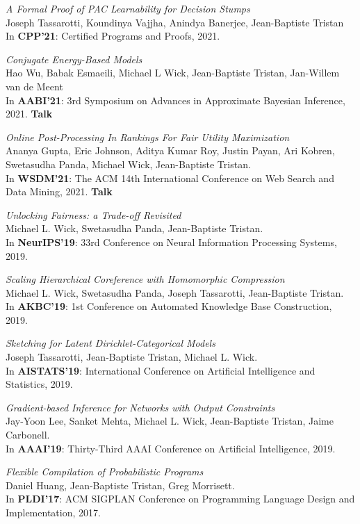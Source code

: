 \documentclass[margin,line]{res}
\begin{document}
\begin{resume}
\emph{A Formal Proof of PAC Learnability for Decision Stumps}\\
Joseph Tassarotti, Koundinya Vajjha, Anindya Banerjee, Jean-Baptiste Tristan\\
In {\bf CPP'21}: Certified Programs and Proofs, 2021.

\emph{Conjugate Energy-Based Models}\\
Hao Wu, Babak Esmaeili, Michael L Wick, Jean-Baptiste Tristan, Jan-Willem van de Meent\\
In {\bf AABI'21}: 3rd Symposium on
Advances in Approximate Bayesian Inference, 2021. {\bf Talk}

\emph{Online Post-Processing In Rankings For Fair Utility Maximization}\\
Ananya Gupta, Eric Johnson, Aditya Kumar Roy, Justin Payan, Ari Kobren, Swetasudha Panda, Michael Wick, Jean-Baptiste Tristan.\\
In {\bf WSDM'21}: The ACM 14th International Conference on Web Search and Data Mining, 2021. {\bf Talk}

\emph{Unlocking Fairness: a Trade-off Revisited}\\
Michael L. Wick, Swetasudha Panda, Jean-Baptiste Tristan.\\
In {\bf NeurIPS'19}: 33rd Conference on Neural Information Processing Systems, 2019.

\emph{Scaling Hierarchical Coreference with Homomorphic Compression}\\
Michael L. Wick, Swetasudha Panda, Joseph Tassarotti, Jean-Baptiste Tristan.\\
In {\bf AKBC'19}: 1st Conference on Automated Knowledge Base Construction, 2019.

\emph{Sketching for Latent Dirichlet-Categorical Models}\\
Joseph Tassarotti, Jean-Baptiste Tristan, Michael L. Wick.\\
In {\bf AISTATS'19}: International Conference on 
Artificial Intelligence and Statistics, 2019.

\emph{Gradient-based Inference for Networks with Output Constraints}\\
Jay-Yoon Lee, Sanket Mehta, Michael L. Wick, Jean-Baptiste Tristan, Jaime Carbonell.\\
In {\bf AAAI'19}: Thirty-Third AAAI Conference on Artificial Intelligence, 2019.

\emph{Flexible Compilation of Probabilistic Programs}\\
Daniel Huang, Jean-Baptiste Tristan, Greg Morrisett.\\
In {\bf PLDI'17}: ACM SIGPLAN Conference on Programming
Language Design and Implementation, 2017.


\end{resume}
\end{document}
